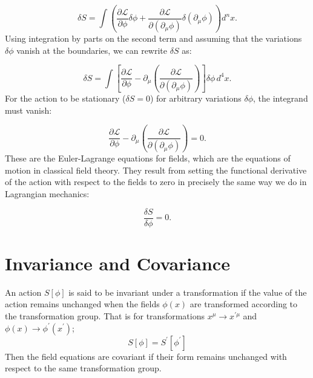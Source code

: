 \documentclass{article}
\begin{document}
\[
\delta S = \int \left( \frac{\partial \mathcal{L}}{\partial \phi} \delta \phi + \frac{\partial \mathcal{L}}{\partial (\partial_\mu \phi)} \delta (\partial_\mu \phi) \right) d^nx.
\]
Using integration by parts on the second term and assuming that the variations \( \delta \phi \) vanish at the boundaries, we can rewrite \( \delta S \) as:

\[
\delta S = \int \left[ \frac{\partial \mathcal{L}}{\partial \phi} - \partial_\mu \left( \frac{\partial \mathcal{L}}{\partial (\partial_\mu \phi)} \right) \right] \delta \phi \, d^4x.
\]
For the action to be stationary (\( \delta S = 0 \)) for arbitrary variations \( \delta \phi \), the integrand must vanish:

\[
\frac{\partial \mathcal{L}}{\partial \phi} - \partial_\mu \left( \frac{\partial \mathcal{L}}{\partial (\partial_\mu \phi)} \right) = 0.
\]
These are the Euler-Lagrange equations for fields, which are the equations of motion in classical field theory.
They result from setting the functional derivative of the action with respect to the fields to zero in precisely the same way we do in Lagrangian mechanics:

\begin{equation}
\frac{\delta S}{\delta \phi} = 0.
\end{equation}

\section{Invariance and Covariance}
An action $S\left[\phi\right]$ is said to be invariant under a transformation if the value of the action remains unchanged when the fields $\phi(x)$ are transformed according to the transformation group.
That is for transformations $x^\mu \rightarrow x^{\prime \mu}$ and $\phi(x) \rightarrow \phi^\prime(x^\prime)$;
\[
	S\left[\phi\right] = S^\prime\left[\phi^\prime\right]
\]
Then the field equations are covariant if their form remains unchanged with respect to the same transformation group.
\end{document}
